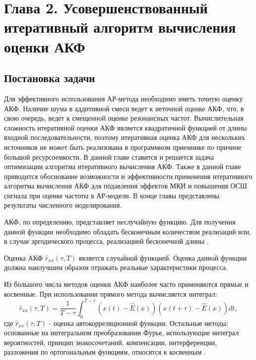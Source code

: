 \setcounter{chapter}{2}
\setcounter{section}{0}
\setcounter{equation}{0}
\setcounter{figure}{0}
\chapter*{Глава 2. Усовершенствованный итеративный алгоритм вычисления оценки АКФ}
\label{l:sec_acf}

\section{Постановка задачи}

Для эффективного использования АР-метода необходимо иметь точную оценку АКФ. Наличие шума в аддитивной смеси ведет к неточной
оценке АКФ, что, в свою очередь, ведет к смещенной оценке резонансных частот. Вычислительная сложность итеративной оценки АКФ является квадратичной
функцией от длины входной последовательности, поэтому итеративная оценка АКФ для нескольких источников не может быть реализована в программном приемнике
по причине большой ресурсоемкости. В данной главе ставится и решается задача оптимизации алгоритма итеративного вычисления АКФ. Также в данной
главе приводится обоснование возможности и эффективности применения итеративного алгоритма вычисления АКФ для подавления эффектов МКИ и повышения ОСШ сигнала
при оценке частоты в АР-модели. В конце главы представлены результаты численного моделирования.

АКФ, по определению, представляет неслучайную функцию.
Для получения данной функции необходимо обладать бесконечным количеством реализаций или, в случае эргодического процесса, реализацией бесконечной длины \cite{bolshakov-book}.

Оценка АКФ ${\hat{r}_{xx}(\tau, T)}$ является случайной функцией. Оценка данной функции должна наилучшим образом отражать реальные характеристики процесса.

Из большого числа методов оценки АКФ наиболее часто применяются прямые и косвенные. При использовании прямого метода вычисляется интеграл:
\begin{equation}
	\label{eq:acf_integral_basic}
	\hat{r}_{xx}(\tau, T) = \frac{1}{T-\tau} \int_{0}^{T-\tau} (x(t) - \hat{E}(x))(x(t+\tau) - \hat{E}(x))dt,
\end{equation}
где ${\hat{r}_{xx}(\tau, T)}$ -  оценка автокорреляционной функции. Остальные методы: основанные на интегральном преобразовании Фурье, использующие интеграл вероятностей, принцип
знакосочетаний, компенсации, интерференции, разложения по ортогональным функциям, относятся к косвенным \cite{bolshakov-book}.


